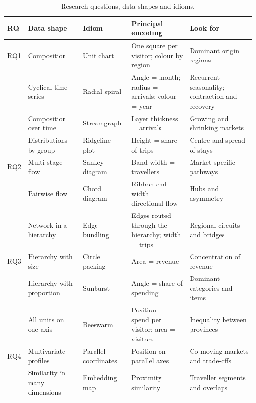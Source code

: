 \documentclass{article}
\begin{document}
\begin{table}[!htbp]
\centering
\caption{Research questions, data shapes and idioms.}
\label{tab:framework}
\small
\renewcommand{\arraystretch}{1.1}
\begin{tabularx}{\linewidth}{@{}l>{\raggedright\arraybackslash}p{2.9cm}>{\raggedright\arraybackslash}p{2.75cm}>{\raggedright\arraybackslash}X>{\raggedright\arraybackslash}X@{}}
\toprule
RQ & Data shape & Idiom & Principal encoding & Look for \\
\midrule
RQ1 & Composition & Unit chart & One square per visitor; colour by region & Dominant origin regions \\
    & Cyclical time series & Radial spiral & Angle = month; radius = arrivals; colour = year & Recurrent seasonality; contraction and recovery \\
    & Composition over time & Streamgraph & Layer thickness = arrivals & Growing and shrinking markets \\
    & Distributions by group & Ridgeline plot & Height = share of trips & Centre and spread of stays \\
\midrule
RQ2 & Multi-stage flow & Sankey diagram & Band width = travellers & Market-specific pathways \\
    & Pairwise flow & Chord diagram & Ribbon-end width = directional flow & Hubs and asymmetry \\
    & Network in a hierarchy & Edge bundling & Edges routed through the hierarchy; width = trips & Regional circuits and bridges \\
\midrule
RQ3 & Hierarchy with size & Circle packing & Area = revenue & Concentration of revenue \\
    & Hierarchy with proportion & Sunburst & Angle = share of spending & Dominant categories and items \\
    & All units on one axis & Beeswarm & Position = spend per visitor; area = visitors & Inequality between provinces \\
\midrule
RQ4 & Multivariate profiles & Parallel coordinates & Position on parallel axes & Co-moving markets and trade-offs \\
    & Similarity in many dimensions & Embedding map & Proximity = similarity & Traveller segments and overlaps \\
\bottomrule
\end{tabularx}
\end{table}
\end{document}
